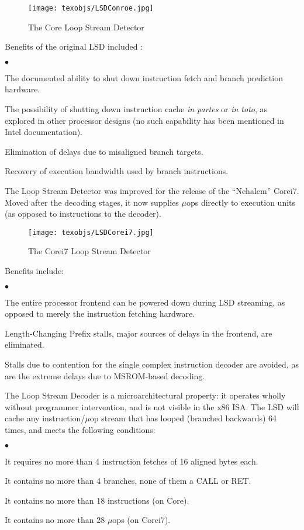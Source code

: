 \documentclass[]{sigplanconf}
\newcommand{\squishlist}{\begin{list}{$\bullet$}
  {\setlength{\itemsep}{0pt}
    \setlength{\parsep}{3pt}
    \setlength{\topsep}{3pt}
    \setlength{\partopsep}{0pt}
    \setlength{\leftmargin}{1.5em}
    \setlength{\labelwidth}{1em}
    \setlength{\labelsep}{0.5em}}}
\newcommand{\squishend}{\end{list}}
\begin{document}
\begin{figure}[h]
\texttt{[image: texobjs/LSDConroe.jpg]}
\caption{The Core Loop Stream Detector}
\label{fig:lsdcorei7}
\end{figure}

Benefits of the original LSD included \cite{inteloptimize}:
\squishlist
\item The documented ability to shut down instruction fetch and branch prediction hardware.
\item The possibility of shutting down instruction cache \textit{in partes} or
\textit{in toto}, as explored in other processor designs \cite{badulescu} (no
such capability has been mentioned in Intel documentation).
\item Elimination of delays due to misaligned branch targets.
\item Recovery of execution bandwidth used by branch instructions.
\squishend

The Loop Stream Detector was improved for the release of the ``Nehalem''
Core\texttrademark i7. Moved after the decoding stages, it now supplies $\mu$ops directly
to execution units (as opposed to instructions to the decoder).

\begin{figure}[h]
\texttt{[image: texobjs/LSDCorei7.jpg]}
\caption{The Core\texttrademark  i7 Loop Stream Detector}
\label{fig:lsdcorei7}
\end{figure}

Benefits include:
\squishlist
\item The entire processor frontend can be powered down during LSD streaming,
as opposed to merely the instruction fetching hardware.
\item Length-Changing Prefix stalls, major sources of delays in the frontend,
are eliminated.
\item Stalls due to contention for the single complex instruction decoder are
avoided, as are the extreme delays due to MSROM-based decoding.
\squishend

The Loop Stream Decoder is a microarchitectural property: it operates wholly
without programmer intervention, and is not visible in the x86 ISA. The LSD
will cache any instruction/$\mu$op stream that has looped (branched backwards)
64 times, and meets the following conditions:
\squishlist
\item It requires no more than 4 instruction fetches of 16 aligned
bytes each.
\item It contains no more than 4 branches, none of them a CALL or RET.
\item It contains no more than 18 instructions (on Core).
\item It contains no more than 28 $\mu$ops (on Core\texttrademark i7).
\squishend
\end{document}
